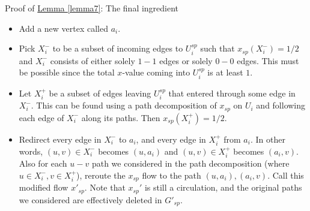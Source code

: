 \documentclass[./main.tex]{subfiles}
\begin{document}
\begin{subsection}{Proof of \hyperref[lemma7]{Lemma \ref{lemma7}}: The final ingredient}
\begin{definition}
\begin{itemize}[$-$]
		\item Add a new vertex called $a_i$.
		\item Pick $X_i^-$ to be a subset of incoming edges to $U_i^{sp}$ such that $x_{sp}(X_i^-) = 1/2$ and $X_i^-$ consists of either solely $1-1$ edges or solely $0-0$ edges. This must be possible since the total $x$-value coming into $U_i^{sp}$ is at least $1$.
		\item Let $X_i^+$ be a subset of edges leaving $U_i^{sp}$ that entered through some edge in $X_i^-$. This can be found using a path decomposition of $x_{sp}$ on $U_i$ and following each edge of $X_i^-$ along its paths. Then $x_{sp}(X_i^+) = 1/2$.
		\item Redirect every edge in $X_i^-$ to $a_i$, and every edge in $X_i^+$ from $a_i$. In other words, $(u,v)\in X_i^-$ becomes $(u,a_i)$ and $(u,v)\in X_i^+$ becomes $(a_i, v)$. Also for each $u-v$ path we considered in the path decomposition (where $u\in X_i^-, v\in X_i^+$), reroute the $x_{sp}$ flow to the path $(u,a_i),(a_i,v)$. Call this modified flow $x'_{sp}$. Note that $x_{sp}'$ is still a circulation, and the original paths we considered are effectively deleted in $G'_{sp}$.
		\end{itemize}
	\end{definition}
		
	\end{subsection}
\end{document}
